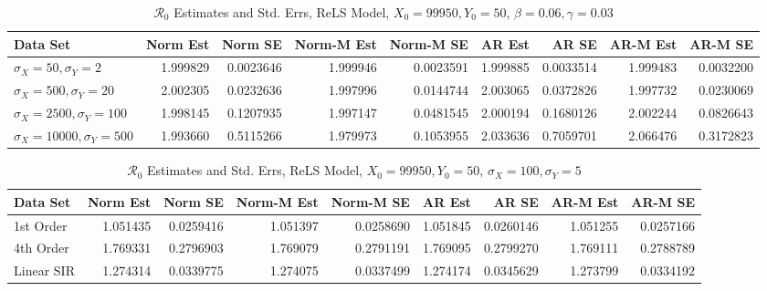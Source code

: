 \documentclass[12pt]{article}
\newcommand{\rr}{\ensuremath{\mathcal{R}_0}}
\begin{document}
\begin{table}[H]
	
	\caption{\label{tab:}$\rr$ Estimates and Std. Errs, ReLS Model,
		$X_0 = 99950, Y_0 = 50$, $\beta = 0.06, \gamma = 0.03$}
	\centering
	\begin{footnotesize}
		\begin{tabular}[t]{l|r|r|r|r|r|r|r|r}
			\hline
			Data Set & Norm Est & Norm SE & Norm-M Est & Norm-M SE & AR Est & AR SE & AR-M Est & AR-M SE\\
			\hline
			$\sigma_X = 50, \sigma_Y = 2$ & 1.999829 & 0.0023646 & 1.999946 & 0.0023591 & 1.999885 & 0.0033514 & 1.999483 & 0.0032200\\
			\hline
			$\sigma_X = 500, \sigma_Y = 20$ & 2.002305 & 0.0232636 & 1.997996 & 0.0144744 & 2.003065 & 0.0372826 & 1.997732 & 0.0230069\\
			\hline
			$\sigma_X = 2500, \sigma_Y = 100$ & 1.998145 & 0.1207935 & 1.997147 & 0.0481545 & 2.000194 & 0.1680126 & 2.002244 & 0.0826643\\
			\hline
			$\sigma_X = 10000, \sigma_Y = 500$ & 1.993660 & 0.5115266 & 1.979973 & 0.1053955 & 2.033636 & 0.7059701 & 2.066476 & 0.3172823\\
			\hline
		\end{tabular}
	\end{footnotesize}
\end{table}

\begin{table}[H]
	
	\caption{\label{tab:}$\rr$ Estimates and Std. Errs, ReLS Model,
		$X_0 = 99950, Y_0 = 50$, $\sigma_X = 100, \sigma_Y = 5$}
	\centering
	\begin{footnotesize}
		\begin{tabular}[t]{l|r|r|r|r|r|r|r|r}
			\hline
			Data Set & Norm Est & Norm SE & Norm-M Est & Norm-M SE & AR Est & AR SE & AR-M Est & AR-M SE\\
			\hline
			1st Order & 1.051435 & 0.0259416 & 1.051397 & 0.0258690 & 1.051845 & 0.0260146 & 1.051255 & 0.0257166\\
			\hline
			4th Order & 1.769331 & 0.2796903 & 1.769079 & 0.2791191 & 1.769095 & 0.2799270 & 1.769111 & 0.2788789\\
			\hline
			Linear SIR & 1.274314 & 0.0339775 & 1.274075 & 0.0337499 & 1.274174 & 0.0345629 & 1.273799 & 0.0334192\\
			\hline
		\end{tabular}
	\end{footnotesize}
\end{table}
\end{document}
